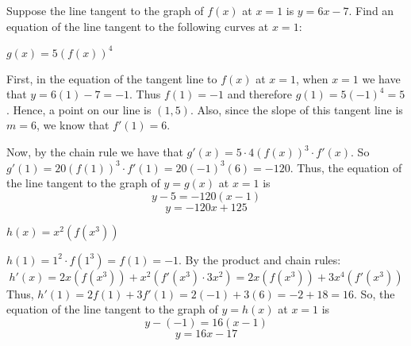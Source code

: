 \documentclass[handout,nooutcomes]{ximera}
\renewenvironment{freeResponse}{
\ifhandout\setbox0\vbox\bgroup\else
\begin{trivlist}\item[\hskip \labelsep\bfseries Solution:\hspace{2ex}]
\fi}
{\ifhandout\egroup\else
\end{trivlist}
\fi}
\begin{document}
\begin{problem}
Suppose the line tangent to the graph of $f(x)$ at $x=1$ is $y=6x-7$.  Find an equation of the line tangent to the following curves at $x=1$:
	\begin{enumerate}
	
	\item  $g(x) = 5(f(x))^4$  
		\begin{freeResponse}
		First, in the equation of the tangent line to $f(x)$ at $x=1$, when $x=1$ we have that $y= 6(1) - 7 = -1$.  Thus $f(1) = -1$ and therefore $g(1) = 5(-1)^4 = 5$.  Hence, a point on our line is $(1,5)$.  Also, since the slope of this tangent line is $m=6$, we know that $f'(1) = 6$.
		
		Now, by the chain rule we have that $g'(x) = 5 \cdot 4 (f(x))^3 \cdot f'(x)$.  So $g'(1) = 20(f(1))^3 \cdot f'(1) = 20(-1)^3 (6) = -120.$  Thus, the equation of the line tangent to the graph of $y = g(x)$ at $x=1$ is
		$$ y - 5 = -120(x-1) $$
		$$ y = -120x + 125 $$
		\end{freeResponse}

	\item  $h(x) = x^2 (f(x^3))$
		\begin{freeResponse}
		$h(1) = 1^2 \cdot f(1^3) = f(1) = -1$.  By the product and chain rules:
		$$ h'(x) = 2x(f(x^3)) + x^2(f'(x^3) \cdot 3x^2) = 2x(f(x^3)) + 3x^4(f'(x^3)) $$
		Thus, $h'(1) = 2f(1) + 3f'(1) = 2(-1) + 3(6) = -2 + 18 = 16$.  So, the equation of the line tangent to the graph of $y=h(x)$ at $x=1$ is
		$$ y- (-1) = 16(x-1) $$
		$$ y = 16x - 17 $$
		\end{freeResponse}
	\end{enumerate}		
\end{problem}
\end{document}
